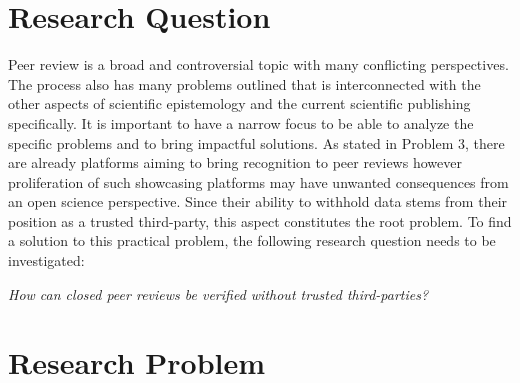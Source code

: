 \section{Research Question}

Peer review is a broad and controversial topic with many conflicting perspectives. The process also has many problems outlined that is interconnected with the other aspects of scientific epistemology and the current scientific publishing specifically. It is important to have a narrow focus to be able to analyze the specific problems and to bring impactful solutions. As stated in Problem 3, there are already platforms aiming to bring recognition to peer reviews however proliferation of such showcasing platforms may have unwanted consequences from an open science perspective. Since their ability to withhold data stems from their position as a trusted third-party, this aspect constitutes the root problem. To find a solution to this practical problem, the following research question needs to be investigated: \\

\begin{center}
    \textit{How can closed peer reviews be verified without trusted third-parties?}
\end{center}

\section{Research Problem}

